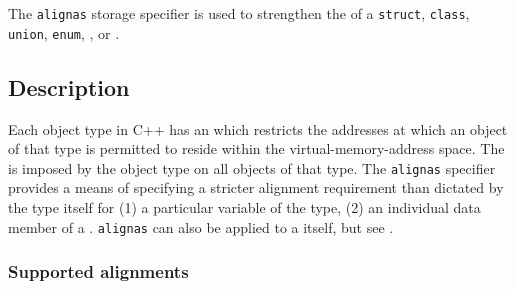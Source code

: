 
\setcounter{table}{0}
\setcounter{footnote}{0}
\setcounter{lstlisting}{0}

The \lstinline!alignas! storage specifier is used to strengthen
the  of a \lstinline!struct!, \lstinline!class!, \lstinline!union!, \lstinline!enum!, , or .

\subsection[Description]{Description}\label{description-alignas}

Each object type in C++ has an  which restricts the addresses at which an object of that type is permitted to reside within the virtual-memory-address space. The  is imposed by the object type on all objects of that type. The \lstinline!alignas! specifier provides a means of specifying a stricter alignment requirement than dictated by the type itself for (1) a particular variable of the type, (2) an individual data member of a . \lstinline!alignas! can also be applied to a  itself, but see .

\subsubsection[Supported alignments]{Supported alignments}\label{description-supported-alignments}

